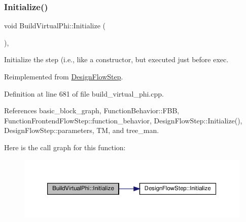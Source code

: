 \mbox{\label{classBuildVirtualPhi_ac9d535c633bc0b4a6f9d9396eaa8d5a5}} 
\subsubsection{\texorpdfstring{Initialize()}{Initialize()}}
{\footnotesize\ttfamily void Build\+Virtual\+Phi\+::\+Initialize (\begin{DoxyParamCaption}{ }\end{DoxyParamCaption})\hspace{0.3cm}{\ttfamily [override]}, {\ttfamily [virtual]}}



Initialize the step (i.\+e., like a constructor, but executed just before exec. 



Reimplemented from \hyperlink{classDesignFlowStep_a44b50683382a094976e1d432a7784799}{Design\+Flow\+Step}.



Definition at line 681 of file build\+\_\+virtual\+\_\+phi.\+cpp.



References basic\+\_\+block\+\_\+graph, Function\+Behavior\+::\+F\+BB, Function\+Frontend\+Flow\+Step\+::function\+\_\+behavior, Design\+Flow\+Step\+::\+Initialize(), Design\+Flow\+Step\+::parameters, TM, and tree\+\_\+man.

Here is the call graph for this function\+:
\nopagebreak
\begin{figure}[H]
\begin{center}
\leavevmode
\includegraphics[width=350pt]{d8/d9b/classBuildVirtualPhi_ac9d535c633bc0b4a6f9d9396eaa8d5a5_cgraph}
\end{center}
\end{figure}
\mbox{\label{classBuildVirtualPhi_a62df9f8fb288d11ede0f7fa4e61b4f1b}} 
